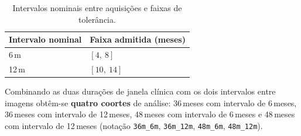 \documentclass[review]{elsarticle}
\newcommand{\code}[1]{\texttt{#1}}
\begin{document}
	\begin{table}[htbp]
		\centering
		\caption{Intervalos nominais entre aquisições e faixas de tolerância.}
		\label{tab:bandas}
		\begin{tabular}{ll}
			\toprule
			Intervalo nominal & Faixa admitida (meses) \\
			\midrule
			6\,m  & $[4,\ 8]$ \\
			12\,m & $[10,\ 14]$ \\
			\bottomrule
		\end{tabular}
	\end{table}
	
	Combinando as duas durações de janela clínica com os dois intervalos entre imagens obtêm-se \textbf{quatro coortes} de análise: 36\,meses com intervalo de 6\,meses, 36\,meses com intervalo de 12\,meses, 48\,meses com intervalo de 6\,meses e 48\,meses com intervalo de 12\,meses (notação \code{36m\_6m}, \code{36m\_12m}, \code{48m\_6m}, \code{48m\_12m}).
	
\end{document}
